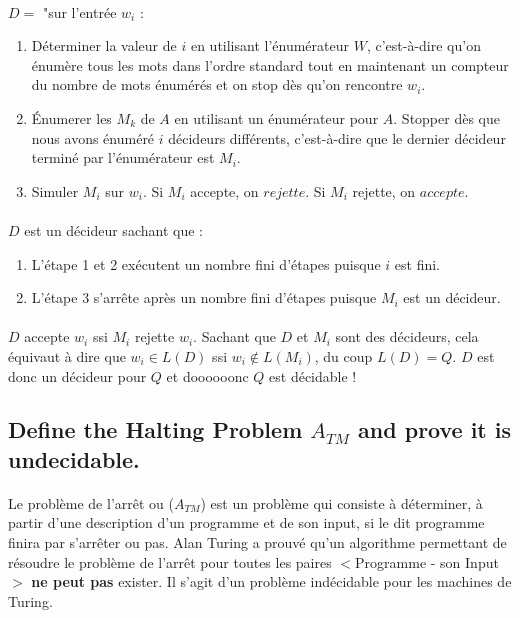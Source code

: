 \paragraph{}

$D = $ "sur l'entrée $w_{i}$ :
\begin{enumerate}
\item Déterminer la valeur de $i$ en utilisant l'énumérateur $W$, c'est-à-dire qu'on énumère tous les mots dans l'ordre standard tout en maintenant un compteur du nombre de mots énumérés et on stop dès qu'on rencontre $w_{i}$.

\item Énumerer les $M_{k}$ de $A$ en utilisant un énumérateur pour $A$. Stopper dès que nous avons énuméré $i$ décideurs différents, c'est-à-dire que le dernier décideur terminé par l'énumérateur est $M_{i}$.
\item Simuler $M_{i}$ sur $w_{i}$. Si $M_{i}$ accepte, on $rejette$. Si $M_{i}$ rejette, on $accepte$.
\end{enumerate}
\paragraph{}
$D$ est un décideur sachant que :
\begin{enumerate}
\item L'étape 1 et 2 exécutent un nombre fini d'étapes puisque $i$ est fini.
\item L'étape 3 s'arrête après un nombre fini d'étapes puisque $M_{i}$ est un décideur.
\end{enumerate}
\paragraph{}
$D$ accepte $w_{i}$ ssi $M_{i}$ rejette $w_{i}$. Sachant que $D$ et $M_{i}$ sont des décideurs, cela équivaut à dire que $w_{i} \in L(D)$ ssi $w_{i} \not\in L(M_{i})$, du coup $L(D) = Q$. $D$ est donc un décideur pour $Q$ et doooooonc $Q$ est décidable ! 


\subsection{Define the Halting Problem \texorpdfstring{$A_{TM}$}{Lg} and prove it is undecidable.}
\paragraph{}
Le problème de l'arrêt ou ($A_{TM}$) est un problème qui consiste à déterminer, à partir d'une description d'un programme et de son input, si le dit programme finira par s'arrêter ou pas. Alan Turing a prouvé qu'un algorithme permettant de résoudre le problème de l'arrêt pour toutes les paires $<$Programme - son Input$>$ \textbf{ne peut pas} exister. Il s'agit d'un problème indécidable pour les machines de Turing.

